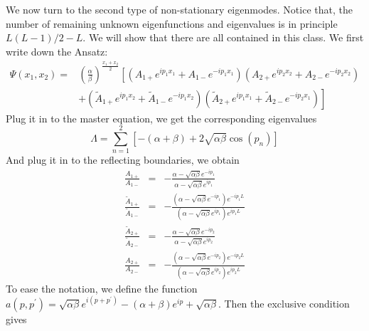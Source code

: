 \documentclass[12pt,a4paper]{article}
\begin{document}
We now turn to the second type of non-stationary eigenmodes. Notice that, the
number of remaining unknown eigenfunctions and eigenvalues is in principle
$L(L-1)/2 - L$. We will show that there are all contained in this class. We
first write down the Ansatz:
\begin{equation}
    \label{eq:nonstationaryModesTwo2}
    \begin{aligned}
        \Psi(x_1, x_2) = &  \left(\frac{\alpha}{\beta}\right)^{\frac{x_1+x_2}{2}} 
        \left[\left( A_{1+} e^{ip_1 x_1} + A_{1-} e^{-ip_1 x_1}\right)  
            \left( A_{2+} e^{ip_2 x_2} + A_{2-} e^{-ip_2 x_2}\right) \right.\\
        & \left. + \left( \tilde{A}_{1+} e^{ip_1 x_2} + \tilde{A}_{1-} e^{-ip_1
                    x_2}\right)  \left( \tilde{A}_{2+} e^{ip_1 x_1} +
                \tilde{A}_{2-} e^{-ip_2 x_1}\right) \right]
    \end{aligned}
\end{equation}
Plug it in to the master equation, we get the corresponding eigenvalues
\begin{equation}
    \label{eq:eigenvaluesTwo2}
    \Lambda = \sum_{n=1}^2\left[-(\alpha+\beta) + 
        2\sqrt{\alpha\beta}\cos(p_n)\right]
\end{equation} 
And plug it in to the reflecting boundaries, we obtain
\begin{subequations}
    \label{eq:scatterFactorBoundary2}
    \begin{eqnarray}
        \frac{A_{1+}}{A_{1-}} & = & -\frac{\alpha-\sqrt{\alpha\beta}
                e^{-ip_1}}{\alpha-\sqrt{\alpha\beta} e^{ip_1}}  \\
        \frac{\tilde{A}_{1+}}{\tilde{A}_{1-}} & = & 
        -\frac{\left(\alpha-\sqrt{\alpha\beta} e^{-ip_1}\right) e^{-ip_1L}}
        {\left(\alpha-\sqrt{\alpha\beta} e^{ip_1}\right) e^{ip_1L}}  \\
        \frac{\tilde{A}_{2+}}{\tilde{A}_{2-}} & = & -\frac{\alpha -
            \sqrt{\alpha\beta} e^{-ip_2}}{\alpha-\sqrt{\alpha\beta} e^{ip_2}}\\
        \frac{A_{2+}}{A_{2-}} & = & -\frac{\left(\alpha-\sqrt{\alpha\beta}
                e^{-ip_2}\right) e^{-ip_2L}}{\left(\alpha-\sqrt{\alpha\beta} 
                e^{ip_2}\right) e^{ip_2L}}
    \end{eqnarray}
\end{subequations}
To ease the notation, we define the function $a(p, p^\prime) =
\sqrt{\alpha\beta}e^{i(p+p^\prime)}-(\alpha+\beta)e^{ip}+\sqrt{\alpha\beta}$.
Then the exclusive condition gives 
\end{document}
